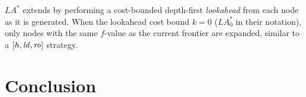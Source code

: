 
$LA^*$ \cite{stern2010look} extends \astar by performing a
cost-bounded depth-first \emph{lookahead} from each node as it is generated.
When the lookahead cost bound $k=0$ ($LA^*_0$ in their notation), only nodes with the same $f$-value as the current \astar frontier are expanded, similar to a $[h,\mbox{\textit{ld}},\mbox{\textit{ro}}]$ strategy.


\section{Conclusion}

